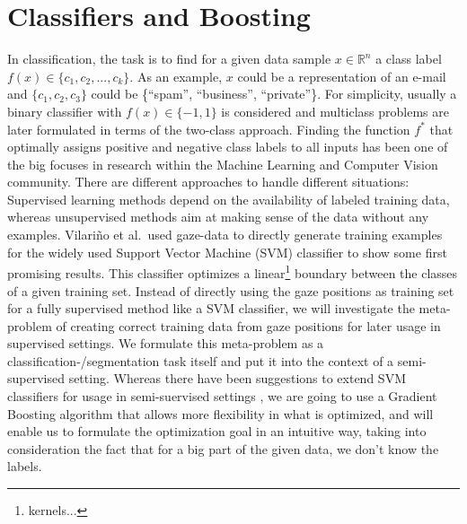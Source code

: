 \section{Classifiers and Boosting}
In classification, the task is to find for a given data sample $x \in \mathbb{R}^n$ a class label $f(x) \in \{c_1, c_2, ..., c_k\}$. As an example, $x$ could be a representation of an e-mail and $\{c_1,c_2,c_3\}$ could be \{``spam'', ``business'', ``private''\}. For simplicity, usually a binary classifier with $f(x) \in \{-1,1\}$ is considered and multiclass problems are later formulated in terms of the two-class approach.  
Finding the function $f^*$ that optimally assigns positive and negative class labels to all inputs has been one of the big focuses in research within the Machine Learning and Computer Vision community. There are different approaches to handle different situations: Supervised learning methods depend on the availability of labeled training data, whereas unsupervised methods aim at making sense of the data without any examples. 
Vilari\~no et al.\ used gaze-data to directly generate training examples for the widely used Support Vector Machine (SVM) classifier to show some first promising results. 
This classifier optimizes a linear\footnote{kernels...} boundary between the classes of a given training set. Instead of directly using the gaze positions as training set for a fully supervised method like a SVM classifier, we will investigate the meta-problem of creating correct training data from gaze positions for later usage in supervised settings. 
We formulate this meta-problem as a classification-/segmentation task itself and put it into the context of a semi-supervised setting. 
Whereas there have been suggestions to extend SVM classifiers for usage in semi-suervised settings , we are going to use a Gradient Boosting algorithm that allows more flexibility in what is optimized, and will enable us to formulate the optimization goal in an intuitive way, taking into consideration the fact that for a big part of the given data, we don't know the labels.


